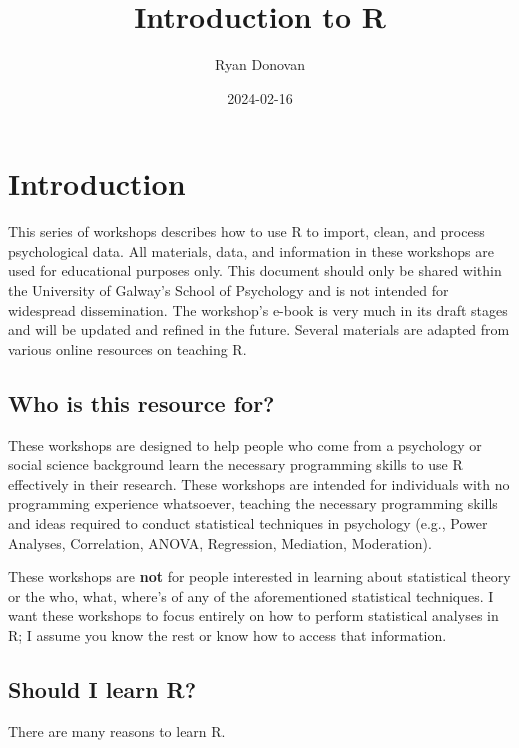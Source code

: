 \documentclass[
]{book}
\title{Introduction to R}
\author{Ryan Donovan}
\date{2024-02-16}
\begin{document}
\maketitle

{
\setcounter{tocdepth}{1}
\tableofcontents
}
\hypertarget{introduction}{%
\chapter{\texorpdfstring{\textbf{Introduction}}{Introduction}}\label{introduction}}

This series of workshops describes how to use R to import, clean, and process psychological data. All materials, data, and information in these workshops are used for educational purposes only. This document should only be shared within the University of Galway's School of Psychology and is not intended for widespread dissemination. The workshop's e-book is very much in its draft stages and will be updated and refined in the future. Several materials are adapted from various online resources on teaching R.

\hypertarget{who-is-this-resource-for}{%
\section{Who is this resource for?}\label{who-is-this-resource-for}}

These workshops are designed to help people who come from a psychology or social science background learn the necessary programming skills to use R effectively in their research. These workshops are intended for individuals with no programming experience whatsoever, teaching the necessary programming skills and ideas required to conduct statistical techniques in psychology (e.g., Power Analyses, Correlation, ANOVA, Regression, Mediation, Moderation).

These workshops are \textbf{not} for people interested in learning about statistical theory or the who, what, where's of any of the aforementioned statistical techniques. I want these workshops to focus entirely on how to perform statistical analyses in R; I assume you know the rest or know how to access that information.

\hypertarget{should-i-learn-r}{%
\section{Should I learn R?}\label{should-i-learn-r}}

There are many reasons to learn R.
\end{document}
